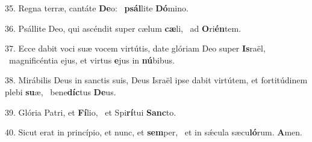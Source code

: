 35. Regna terræ, cantáte \textbf{De}o: \ast\  \textbf{psál}lite \textbf{Dó}mino.\

36. Psállite Deo, qui ascéndit super cælum \textbf{cæ}li, \ast\  ad \textbf{O}ri\textbf{én}tem.\

37. Ecce dabit voci suæ vocem virtútis, date glóriam Deo super \textbf{Is}raël, \ast\  magnificéntia ejus, et virtus \textbf{e}jus in \textbf{nú}bibus.\

38. Mirábilis Deus in sanctis suis, Deus Israël ipse dabit virtútem, et fortitúdinem plebi \textbf{su}æ, \ast\  bene\textbf{díc}tus \textbf{De}us.\

39. Glória Patri, et \textbf{Fí}lio, \ast\  et Spi\textbf{rí}tui \textbf{Sanc}to.\

40. Sicut erat in princípio, et nunc, et \textbf{sem}per, \ast\  et in sǽcula sæcu\textbf{ló}rum. \textbf{A}men.\

